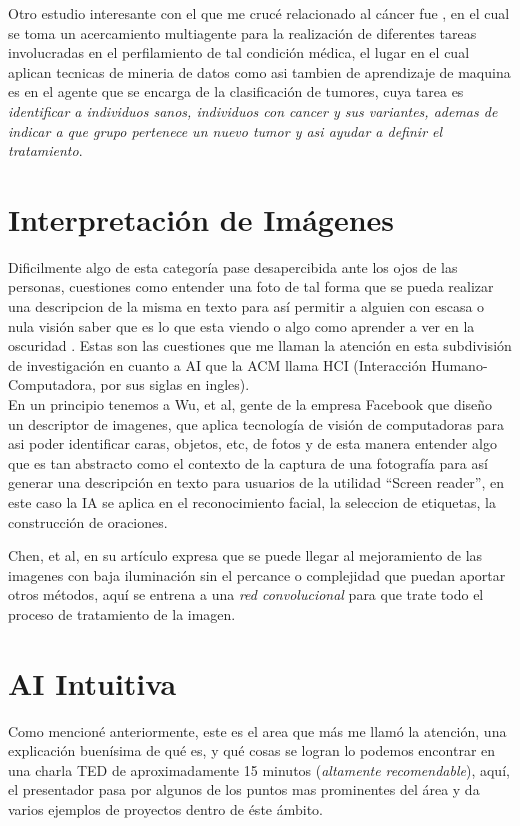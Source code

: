 \documentclass{article}
\begin{document}
Otro estudio interesante con el que me cruc\'e relacionado al c\'ancer fue \cite{marquez2009}, en el cual se toma un acercamiento multiagente para la realizaci\'on de diferentes tareas involucradas en el perfilamiento de tal condici\'on m\'edica, el lugar en el cual aplican tecnicas de mineria de datos como asi tambien de aprendizaje de maquina es en el agente que se encarga de la clasificaci\'on de tumores, cuya tarea es \textit{identificar a individuos sanos, individuos con cancer y sus variantes, ademas de indicar a que grupo pertenece un nuevo tumor y asi ayudar a definir el tratamiento}.

\section{Interpretaci\'on de Im\'agenes}
\label{sec:imagenes}
Dificilmente algo de esta categor\'ia pase desapercibida ante los ojos de las personas, cuestiones como entender una foto de tal forma que se pueda realizar una descripcion de la misma en texto para as\'i permitir a alguien con escasa o nula visi\'on saber que es lo que esta viendo \cite{wu2017} o algo como aprender a ver en la oscuridad \cite{chen2018}.
Estas son las cuestiones que me llaman la atenci\'on en esta subdivisi\'on de investigaci\'on en cuanto a AI que la ACM llama HCI (Interacci\'on Humano-Computadora, por sus siglas en ingles).\\

En un principio tenemos a Wu, et al, gente de la empresa Facebook que dise\~{n}o un descriptor de imagenes, que aplica tecnolog\'ia de visi\'on de computadoras para asi poder identificar caras, objetos, etc, de fotos y de esta manera entender algo que es tan abstracto como el contexto de la captura de una fotograf\'ia para as\'i generar una descripci\'on en texto para usuarios de la utilidad ``Screen reader'', en este caso la IA se aplica en el reconocimiento facial, la seleccion de etiquetas, la construcci\'on de oraciones.

Chen, et al, en su art\'iculo expresa que se puede llegar al mejoramiento de las imagenes con baja iluminaci\'on sin el percance o complejidad que puedan aportar otros m\'etodos, aqu\'i se entrena a una \textit{red convolucional} para que trate todo el proceso de tratamiento de la imagen.

\section{AI Intuitiva}
\label{sec:aiintuitiva}
Como mencion\'e anteriormente, este es el area que m\'as me llam\'o la atenci\'on, una explicaci\'on buen\'isima de qu\'e es, y qu\'e cosas se logran lo podemos encontrar en una charla TED de aproximadamente 15 minutos \cite{conti2016} (\textit{altamente recomendable}), aqu\'i, el presentador pasa por algunos de los puntos mas prominentes del \'area y da varios ejemplos de proyectos dentro de \'este \'ambito.
\end{document}
